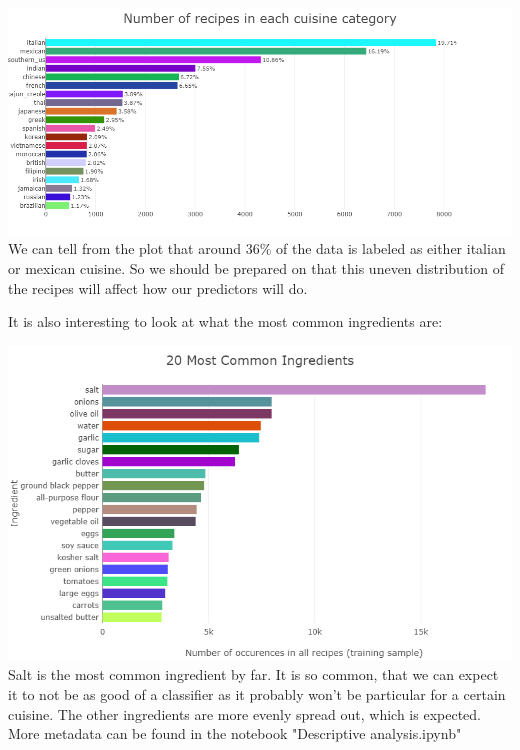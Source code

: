 \documentclass[parskip=half]{scrartcl}
\theoremstyle{definition}
\theoremstyle{remark}
\begin{document}
\includegraphics[scale=.42]{images/cuisine_number}
We can tell from the plot that around 36\% of the data is labeled as either italian or mexican cuisine. So we should be prepared on that this uneven distribution of the recipes will affect how our predictors will do.

It is also interesting to look at what the most common ingredients are:

\includegraphics[scale=.55]{images/common_ing}
Salt is the most common ingredient by far. It is so common, that we can expect it to not be as good of a classifier as it probably won't be particular for a certain cuisine.
The other ingredients are more evenly spread out, which is expected.
More metadata can be found in the notebook "Descriptive analysis.ipynb"
\end{document}
